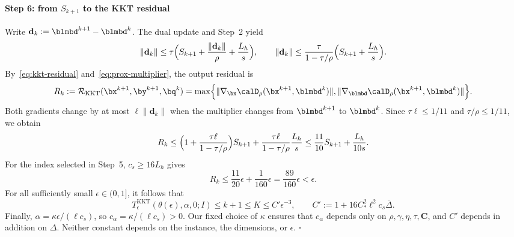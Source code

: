 \paragraph{Step 6: from \(S_{k+1}\) to the KKT residual}
Write \(\mathbf d_k:=\blmbd^{k+1}-\blmbd^k\). The dual update and
Step~2 yield
\[
\|\mathbf d_k\|\le\tau\Bigl(S_{k+1}
+\frac{\|\mathbf d_k\|}\rho+\frac{L_h}s\Bigr),\qquad
\|\mathbf d_k\|\le\frac\tau{1-\tau/\rho}
\Bigl(S_{k+1}+\frac{L_h}s\Bigr).
\]
By~\eqref{eq:kkt-residual} and~\eqref{eq:prox-multiplier}, the output
residual is
\[
R_k:=\mathcal R_{\mathrm{KKT}}(\bx^{k+1},\by^{k+1},\bq^k)
=\max\Bigl\{\|\nabla_{\bx}\calD_\rho(\bx^{k+1},\blmbd^k)\|,
\|\nabla_{\blmbd}\calD_\rho(\bx^{k+1},\blmbd^k)\|\Bigr\}.
\]
Both gradients change by at most \(\ell\|\mathbf d_k\|\) when the
multiplier changes from \(\blmbd^{k+1}\) to \(\blmbd^k\). Since
\(\tau\ell\le1/11\) and \(\tau/\rho\le1/11\), we obtain
\begin{equation}
R_k\le\Bigl(1+\frac{\tau\ell}{1-\tau/\rho}\Bigr)S_{k+1}
+\frac{\tau\ell}{1-\tau/\rho}\frac{L_h}s
\le\frac{11}{10}S_{k+1}+\frac{L_h}{10s}.
\label{eq:beta0-residual-transfer}
\end{equation}
For the index selected in Step~5, \(c_s\ge16L_h\) gives
\[
R_k\le\frac{11}{20}\epsilon+\frac1{160}\epsilon
=\frac{89}{160}\epsilon<\epsilon.
\]
For all sufficiently small \(\epsilon\in(0,1]\), it follows that
\[
T^{\mathrm{KKT}}_\epsilon(\theta(\epsilon),\alpha,0;I)
\le k+1\le K\le C'\epsilon^{-3},\qquad
C':=1+16C_*^2\ell^2c_s\bar\Delta.
\]
Finally, \(\alpha=\kappa\epsilon/(\ell c_s)\), so
\(c_\alpha=\kappa/(\ell c_s)>0\). Our fixed choice of \(\kappa\)
ensures that \(c_\alpha\) depends only on
\(\rho,\gamma,\eta,\tau,\mathbf C\), and \(C'\) depends in addition
on \(\Delta\). Neither constant depends on the instance, the dimensions,
or \(\epsilon\).
\hfill\(\square\)

